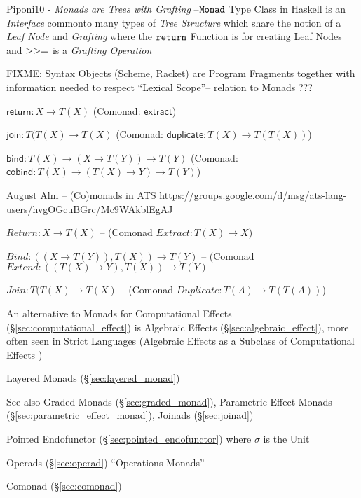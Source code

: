 Piponi10 - \emph{Monads are Trees with Grafting}
--$\mathtt{Monad}$ Type Class in Haskell is an \emph{Interface} commonto many
types of \emph{Tree Structure} which share the notion of a \emph{Leaf Node} and
\emph{Grafting} where the $\mathtt{return}$ Function is for creating Leaf Nodes
and $\mathtt{>>=}$ is a \emph{Grafting Operation}

FIXME: Syntax Objects (Scheme, Racket) are Program Fragments together
with information needed to respect ``Lexical Scope''-- relation to
Monads ???

$\mathsf{return} : X \rightarrow T(X)$ (Comonad: $\textsf{extract}$)

$\mathsf{join} : T(T(X) \rightarrow T(X)$ (Comonad:
$\textsf{duplicate} : T(X) \rightarrow T(T(X))$)

$\mathsf{bind} : T(X) \rightarrow (X \rightarrow T(Y)) \rightarrow
T(Y)$ (Comonad: $\mathsf{cobind} : T(X) \rightarrow (T(X) \rightarrow
Y) \rightarrow T(Y)$)


\asterism


August Alm -- (Co)monads in ATS
\url{https://groups.google.com/d/msg/ats-lang-users/hvgOGcuBGrc/Mc9WAkblEgAJ}

$Return : X \rightarrow T(X)$ -- (Comonad $Extract : T(X) \rightarrow
X$)

$Bind : ((X \rightarrow T(Y)), T(X)) \rightarrow T(Y)$ -- (Comonad
$Extend : ((T(X) \rightarrow Y), T(X)) \rightarrow T(Y)$

$Join : T(T(X) \rightarrow T(X)$ -- (Comonad $Duplicate : T(A)
\rightarrow T(T(A))$)


\asterism


An alternative to Monads for Computational Effects
(\S\ref{sec:computational_effect}) is Algebraic Effects
(\S\ref{sec:algebraic_effect}), more often seen in Strict Languages
(Algebraic Effects as a Subclass of Computational Effects
\cite{plotkin-pretnar09})

Layered Monads (\S\ref{sec:layered_monad}) \cite{filinski99}

\fist See also Graded Monads (\S\ref{sec:graded_monad}), Parametric
Effect Monads (\S\ref{sec:parametric_effect_monad}), Joinads
(\S\ref{sec:joinad})

Pointed Endofunctor (\S\ref{sec:pointed_endofunctor}) where $\sigma$
is the Unit

Operads (\S\ref{sec:operad}) ``Operations Monads''


\asterism


Comonad (\S\ref{sec:comonad})

